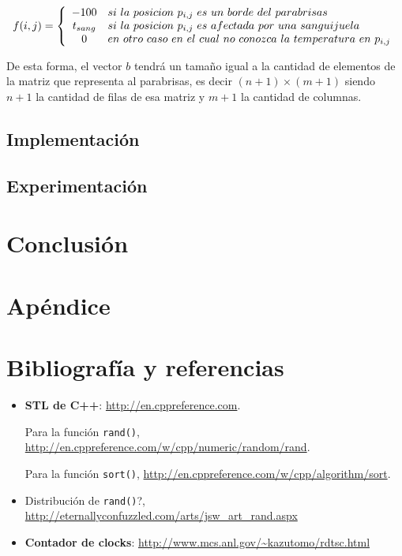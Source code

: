 $$f(i,j) = \left\{
\begin{array}{c l}
 -100 & si \ la \ posicion  \ p_{i,j} \ es  \ un \ borde  \ del \ parabrisas\\
 t_{sang} & si \ la \ posicion  \ p_{i,j} \ es \ afectada \ por \ una \ sanguijuela \\
 0 & en \ otro \ caso \ en \ el \ cual \ no \ conozca \ la \ temperatura \ en \ p_{i,j}
\end{array}
\right.
$$

De esta forma, el vector $b$ tendrá un tamaño igual a la cantidad de elementos de la matriz que representa al parabrisas, es decir $(n+1) \times (m+1)$ siendo $n+1$ la cantidad de filas de esa matriz y $m+1$ la cantidad de columnas.

\subsection{Implementación}

\subsection{Experimentación}

\section{Conclusión}

\section{Apéndice}

\section{Bibliografía y referencias} %

\begin{itemize}
	\item \textbf{STL de C++}: \url{http://en.cppreference.com}.
	\par Para la función \texttt{rand()}, \url{http://en.cppreference.com/w/cpp/numeric/random/rand}.
	\par Para la función \texttt{sort()}, \url{http://en.cppreference.com/w/cpp/algorithm/sort}.
	\item Distribución de \texttt{rand()}?, \url{http://eternallyconfuzzled.com/arts/jsw\_art\_rand.aspx}
	\item \textbf{Contador de clocks}: \url{http://www.mcs.anl.gov/\~kazutomo/rdtsc.html}
\end{itemize}


